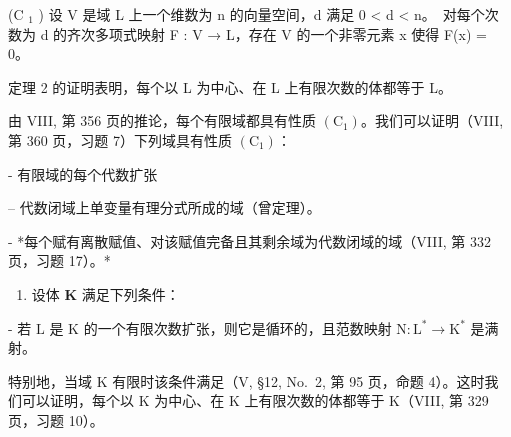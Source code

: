 (C \(_{1}\) ) 设 V 是域 L 上一个维数为 n 的向量空间，d 满足 0 \textless{} d \textless{} n。~对每个次数为 d 的齐次多项式映射 F : V → L，存在 V 的一个非零元素 x 使得 F(x) = 0。

定理 2 的证明表明，每个以 L 为中心、在 L 上有限次数的体都等于 L。

由 VIII, 第 356 页的推论，每个有限域都具有性质 \((\mathrm{C}_{1})\)。我们可以证明（VIII, 第 360 页，习题 7）下列域具有性质 \((\mathrm{C}_{1})\)：

- 有限域的每个代数扩张

-- 代数闭域上单变量有理分式所成的域（曾定理）。

- *每个赋有离散赋值、对该赋值完备且其剩余域为代数闭域的域（VIII, 第 332 页，习题 17）。*

\begin{enumerate}
\def\labelenumi{\arabic{enumi})}
\setcounter{enumi}{2}
\tightlist
\item
  设体 \(\mathbf{K}\) 满足下列条件：
\end{enumerate}

- 若 \(\mathrm{L}\) 是 \(\mathrm{K}\) 的一个有限次数扩张，则它是循环的，且范数映射 \(\mathrm{N}:\mathrm{L}^{*}\to \mathrm{K}^{*}\) 是满射。

特别地，当域 K 有限时该条件满足（V, §12, No.~2, 第 95 页，命题 4）。这时我们可以证明，每个以 K 为中心、在 K 上有限次数的体都等于 K（VIII, 第 329 页，习题 10）。

